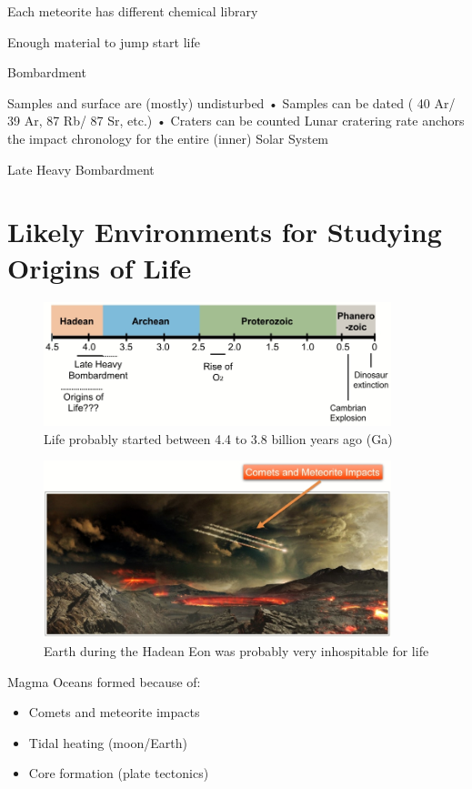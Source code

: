 \documentclass[]{article}
\begin{document}
Each meteorite has different chemical library

Enough material to jump start life

Bombardment

Samples and surface are (mostly) undisturbed
• Samples can be dated ( 40 Ar/ 39 Ar, 87 Rb/ 87 Sr, etc.)
• Craters can be counted
Lunar cratering rate anchors
the impact chronology for the
entire (inner) Solar System

Late Heavy Bombardment

\section{Likely Environments for Studying Origins of Life}

\begin{figure}[h!]
	\caption{Life probably started between 4.4 to 3.8 billion years ago (Ga) \cite{domagal2016astrobiology}}
	\includegraphics[width=0.9\textwidth]{LifeProbablyStarted}
\end{figure}

\begin{figure}[h!]
	\caption{Earth during the Hadean Eon was probably very inhospitable for life} 
	\includegraphics[width=0.9\textwidth]{HadeanInhospitable}
\end{figure}
 Magma Oceans formed because of:
\begin{itemize}
	\item Comets and meteorite impacts
	\item Tidal heating (moon/Earth)
	\item Core formation (plate tectonics)
\end{itemize}
\end{document}
